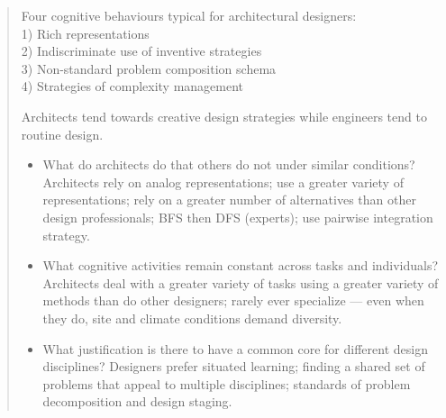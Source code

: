 		\begin{quote}
		\small
		Four cognitive behaviours typical for architectural designers:\\ 
			1) Rich representations\\
			2) Indiscriminate use of inventive strategies\\
			3) Non-standard problem composition schema\\
			4) Strategies of complexity management
		
		Architects tend towards creative design strategies while engineers tend to routine design.
		
			\begin{itemize}
			
			\item {What do architects do that others do not under similar conditions?}
			Architects rely on analog representations; use a greater variety of representations;
			rely on a greater number of alternatives than other design professionals;
			BFS then DFS (experts); use pairwise integration strategy.
			
			\item {What cognitive activities remain constant across tasks and individuals?}
			Architects deal with a greater variety of tasks using a greater variety of
			methods than do other designers; rarely ever specialize --- even when they do,
			site and climate conditions demand diversity.
			
			\item {What justification is there to have a common core for different design disciplines?}
			Designers prefer situated learning; finding a shared set of problems that appeal
			to multiple disciplines; standards of problem decomposition and design staging.
			
			\end{itemize}
		
		\end{quote}


